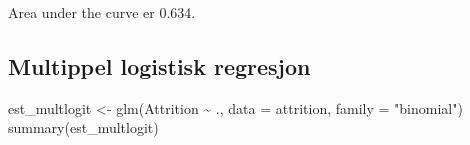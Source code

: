 \documentclass[
  letterpaper,
  DIV=11,
  numbers=noendperiod]{scrreprt}
\newenvironment{Shaded}{\begin{snugshade}}{\end{snugshade}}
\newcommand{\AttributeTok}[1]{\textcolor[rgb]{0.40,0.45,0.13}{#1}}
\newcommand{\FunctionTok}[1]{\textcolor[rgb]{0.28,0.35,0.67}{#1}}
\newcommand{\NormalTok}[1]{\textcolor[rgb]{0.00,0.23,0.31}{#1}}
\newcommand{\OtherTok}[1]{\textcolor[rgb]{0.00,0.23,0.31}{#1}}
\newcommand{\SpecialCharTok}[1]{\textcolor[rgb]{0.37,0.37,0.37}{#1}}
\newcommand{\StringTok}[1]{\textcolor[rgb]{0.13,0.47,0.30}{#1}}
\theoremstyle{definition}
\theoremstyle{remark}
\begin{document}
Area under the curve er 0.634.

\hypertarget{multippel-logistisk-regresjon}{%
\subsection{Multippel logistisk
regresjon}\label{multippel-logistisk-regresjon}}

\begin{Shaded}
\begin{Highlighting}[]
\NormalTok{est\_multlogit }\OtherTok{\textless{}{-}} \FunctionTok{glm}\NormalTok{(Attrition }\SpecialCharTok{\textasciitilde{}}\NormalTok{ ., }\AttributeTok{data =}\NormalTok{ attrition, }\AttributeTok{family =} \StringTok{"binomial"}\NormalTok{)}
\FunctionTok{summary}\NormalTok{(est\_multlogit)}
\end{Highlighting}
\end{Shaded}
\end{document}
